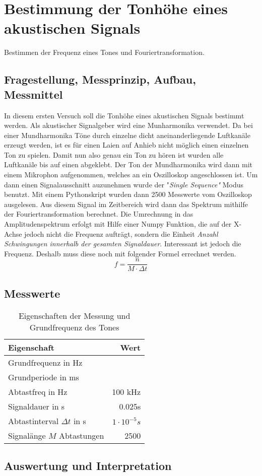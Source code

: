 %
%
\chapter{Bestimmung der Tonhöhe eines akustischen Signals}
\label{chap:VERSUCH_1}
Bestimmen der Frequenz eines Tones und Fouriertransformation.
 
\section{Fragestellung, Messprinzip, Aufbau, Messmittel}
\label{chap:VERSUCH_1_FRAGESTELLUNG}
In diesem ersten Versuch soll die Tonhöhe eines akustischen Signals bestimmt werden. Als akustischer Signalgeber wird eine Munharmonika verwendet. Da bei einer Mundharmonika Töne durch einzelne dicht aneinanderliegende Luftkanäle erzeugt werden, ist es für einen Laien auf Anhieb nicht möglich einen einzelnen Ton zu spielen. Damit nun also genau ein Ton zu hören ist wurden alle Luftkanäle bis auf einen abgeklebt.
Der Ton der Mundharmonika wird dann mit einem Mikrophon aufgenommen, welches an ein Oszilloskop angeschlossen ist. Um dann einen Signalausschnitt auzunehmen wurde der "\textit{Single Sequence"} Modus benutzt. Mit einem Pythonskript wurden dann 2500 Messwerte vom Oszilloskop ausgelesen.
Aus diesem Signal im Zeitbereich wird dann das Spektrum mithilfe der Fouriertransformation berechnet. Die Umrechnung in das Amplitudenspektrum
erfolgt mit Hilfe einer Numpy Funktion, die auf der X-Achse jedoch nicht die Frequenz aufträgt, sondern die Einheit \textit{Anzahl Schwingungen innerhalb der gesamten Signaldauer}. Interessant ist jedoch die Frequenz. Deshalb muss diese noch mit folgender Formel errechnet werden.
\begin{equation}
f = \dfrac{n}{M \cdot \Delta t}
\end{equation}



\section{Messwerte}
\label{chap:VERSUCH_1_MESSWERTE}


\begin{table}[H]
\begin{tabular}{l|r}
Eigenschaft & Wert \\ \hline
Grundfrequenz in Hz & \\
Grundperiode in ms & \\
Abtastfreq in Hz & 100 kHz\\
Signaldauer in s & 0.025s\\
Abtastinterval $\Delta t$ in s & $1 \cdot 10^{-5}s$\\
Signalänge $M$ Abtastungen & 2500\\

\end{tabular}
\caption{Eigenschaften der Messung und Grundfrequenz des Tones}
\label{tab:Eigenschaften}
\end{table}

\section{Auswertung und Interpretation}
\label{chap:VERSUCH_1_AUSWERTUNG}
